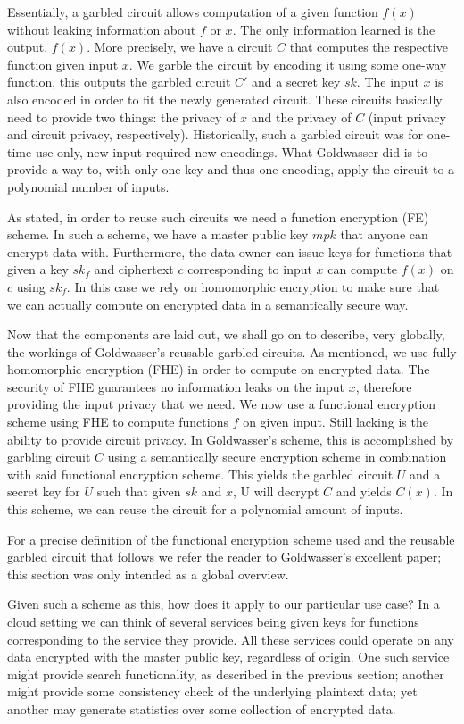 \documentclass[11pt]{article}
\begin{document}
Essentially, a garbled circuit allows computation of a given function $f(x)$ without leaking information about $f$ or $x$.
The only information learned is the output, $f(x)$.
More precisely, we have a circuit $C$ that computes the respective function given input $x$.
We garble the circuit by encoding it using some one-way function, this outputs the garbled circuit $C'$ and a secret key $sk$.
The input $x$ is also encoded in order to fit the newly generated circuit.
These circuits basically need to provide two things: the privacy of $x$ and the privacy of $C$ (input privacy and circuit privacy, respectively).
Historically, such a garbled circuit was for one-time use only, new input required new encodings.
What Goldwasser did is to provide a way to, with only one key and thus one encoding, apply the circuit to a polynomial number of inputs.

As stated, in order to reuse such circuits we need a function encryption (FE) scheme.
In such a scheme, we have a master public key $mpk$ that anyone can encrypt data with.
Furthermore, the data owner can issue keys for functions that given a key $sk_f$ and ciphertext $c$ corresponding to input $x$ can compute $f(x)$ on $c$ using $sk_f$.
In this case we rely on homomorphic encryption to make sure that we can actually compute on encrypted data in a semantically secure way.

Now that the components are laid out, we shall go on to describe, very globally, the workings of Goldwasser's reusable garbled circuits.
As mentioned, we use fully homomorphic encryption (FHE) in order to compute on encrypted data.
The security of FHE guarantees no information leaks on the input $x$, therefore providing the input privacy that we need.
We now use a functional encryption scheme using FHE to compute functions $f$ on given input.
Still lacking is the ability to provide circuit privacy.
In Goldwasser's scheme, this is accomplished by garbling circuit $C$ using a semantically secure encryption scheme in combination with said functional encryption scheme.
This yields the garbled circuit $U$ and a secret key for $U$ such that given $sk$ and $x$, U will decrypt $C$ and yields $C(x)$.
In this scheme, we can reuse the circuit for a polynomial amount of inputs.

For a precise definition of the functional encryption scheme used and the reusable garbled circuit that follows we refer the reader to Goldwasser's excellent paper; this section was only intended as a global overview.

Given such a scheme as this, how does it apply to our particular use case?
In a cloud setting we can think of several services being given keys for functions corresponding to the service they provide.
All these services could operate on any data encrypted with the master public key, regardless of origin.
One such service might provide search functionality, as described in the previous section;
another might provide some consistency check of the underlying plaintext data;
yet another may generate statistics over some collection of encrypted data.
\end{document}
